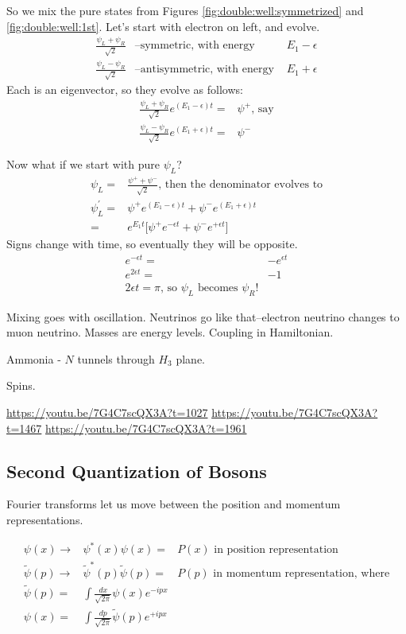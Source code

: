 \documentclass[]{article}
\begin{document}
So we mix the pure states from Figures \ref{fig:double:well:symmetrized} and \ref{fig:double:well:1st}. Let's start with electron on left, and evolve.
\begin{align*}
\frac{\psi_L+\psi_R}{\sqrt{2}}& \text{--symmetric, with energy }& E_1-\epsilon\\
\frac{\psi_L-\psi_R}{\sqrt{2}}& \text{--antisymmetric, with energy }& E_1+\epsilon
\end{align*}
Each is an eigenvector, so they evolve as follows:
\begin{align*}
\frac{\psi_L+\psi_R}{\sqrt{2}} e^{(E_1-\epsilon)t}=&\psi^+ \text{, say}\\
\frac{\psi_L-\psi_R}{\sqrt{2}}e^{(E_1+\epsilon)t}=&\psi^-
\end{align*}

Now what if we start with pure $\psi_L$?
\begin{align*}
	\psi_L =& \frac{\psi^+ + \psi^-}{\sqrt{2}}\text{, then the denominator evolves to}\\
	\psi_L^\prime =&\psi^+ e^{(E_1-\epsilon)t} + \psi^- e^{(E_1+\epsilon)t}\\
	=&e^{E_1 t}\big[\psi^+ e^{-\epsilon t} + \psi^- e^{+\epsilon t}\big]
\end{align*}
Signs change with time, so eventually they will be opposite.
\begin{align*}
e^{-\epsilon t} =& - e^{\epsilon t}\\
e^{2 \epsilon t}=&-1\\
2 \epsilon t = \pi \text{, so $\psi_L$ becomes $\psi_R$!}
\end{align*}

Mixing goes with oscillation. Neutrinos go like that--electron neutrino changes to muon neutrino. Masses are energy levels. Coupling in Hamiltonian.

Ammonia - $N$ tunnels through $H_3$ plane. 

Spins.

\url{https://youtu.be/7G4C7scQX3A?t=1027}
\url{https://youtu.be/7G4C7scQX3A?t=1467}
\url{https://youtu.be/7G4C7scQX3A?t=1961}

\subsection{Second Quantization of Bosons}

Fourier transforms let us move between the position and momentum representations.

\begin{align*}
\psi(x) \rightarrow& \psi^*(x)\psi(x)=&P(x) \text{ in position representation}\\
\widetilde{\psi}(p) \rightarrow& \widetilde{\psi}^*(p) \widetilde{\psi}(p) =&P(p) \text{ in momentum representation, where}\\
\widetilde{\psi}(p) =& \int \frac{dx}{\sqrt{2\pi}} \psi(x) e^{-i p x}\\
\psi(x) =& \int \frac{dp}{\sqrt{2\pi}} \widetilde{\psi}(p) e^{+i p x}
\end{align*}
\end{document}
